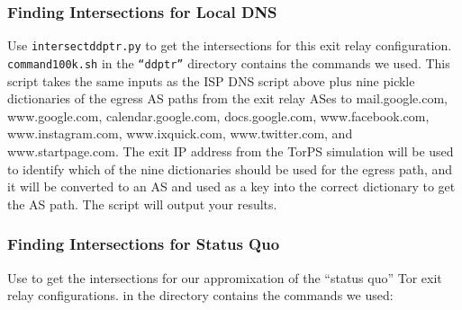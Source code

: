 \documentclass{article}
\begin{document}
\subsubsection{Finding Intersections for Local DNS}
Use {\tt intersect\textunderscore ddptr.py} to get the intersections for this
exit relay configuration. {\tt command\textunderscore 100k.sh} in the {\tt ``ddptr''}
directory contains the commands we used. This script takes the same inputs as the ISP
DNS script above plus nine pickle dictionaries of the egress AS paths from the
exit relay ASes to mail.google.com, www.google.com, calendar.google.com,
docs.google.com, www.facebook.com, www.instagram.com, www.ixquick.com, www.twitter.com,
and www.startpage.com. The exit IP address from the TorPS simulation will be used
to identify which of the nine dictionaries should be used for the egress path, and
it will be converted to an AS and used as a key into the correct dictionary to get
the AS path. The script will output your results.

\subsubsection{Finding Intersections for Status Quo}
Use  to get the
intersections for our appromixation of the ``status quo'' Tor exit relay
configurations.  in the directory
 contains the commands we used:
\end{document}
